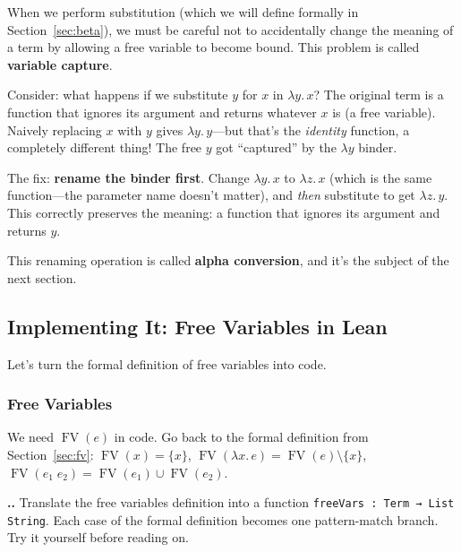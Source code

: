 \documentclass[11pt,a4paper]{article}
\newcounter{exercise}[section]
\renewcommand{\theexercise}{\thesection.\arabic{exercise}}
\theoremstyle{definition}
\newcommand{\lam}{\lambda}
\newcommand{\FV}{\operatorname{FV}}
\begin{document}
\begin{warning}
When we perform substitution (which we will define formally in
Section~\ref{sec:beta}), we must be careful not to accidentally change the
meaning of a term by allowing a free variable to become bound. This problem is
called \textbf{variable capture}.

Consider: what happens if we substitute $y$ for $x$ in $\lam y.\, x$? The
original term is a function that ignores its argument and returns whatever $x$
is (a free variable). Naively replacing $x$ with $y$ gives $\lam y.\, y$---but
that's the \emph{identity} function, a completely different thing! The free $y$
got ``captured'' by the $\lam y$ binder.

The fix: \textbf{rename the binder first}. Change $\lam y.\, x$ to
$\lam z.\, x$ (which is the same function---the parameter name doesn't matter),
and \emph{then} substitute to get $\lam z.\, y$. This correctly preserves the
meaning: a function that ignores its argument and returns $y$.

This renaming operation is called \textbf{alpha conversion}, and it's the
subject of the next section.
\end{warning}


\subsection{Implementing It: Free Variables in Lean}\label{sec:impl-fv}

Let's turn the formal definition of free variables into code.

\subsubsection{Free Variables}

We need $\FV(e)$ in code. Go back to the formal definition from
Section~\ref{sec:fv}:
$\FV(x) = \{x\}$, \;$\FV(\lam x.\, e) = \FV(e) \setminus \{x\}$, \;
$\FV(e_1\; e_2) = \FV(e_1) \cup \FV(e_2)$.

\begin{exercisebox}
\textbf{\theexercise.}\; Translate the free variables definition into a function \texttt{freeVars : Term → List String}. Each case of the formal definition becomes one pattern-match branch. Try it yourself before reading on.
\end{exercisebox}
\end{document}
